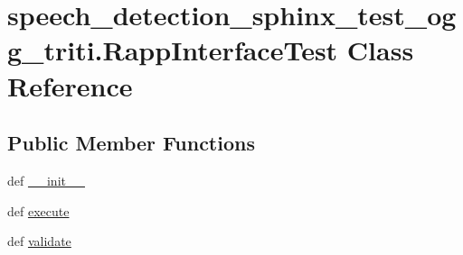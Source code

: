 \hypertarget{classspeech__detection__sphinx__test__ogg__triti_1_1RappInterfaceTest}{\section{speech\-\_\-detection\-\_\-sphinx\-\_\-test\-\_\-ogg\-\_\-triti.\-Rapp\-Interface\-Test Class Reference}
\label{classspeech__detection__sphinx__test__ogg__triti_1_1RappInterfaceTest}
}
\subsection*{Public Member Functions}
\begin{DoxyCompactItemize}
\item 
def \hyperlink{classspeech__detection__sphinx__test__ogg__triti_1_1RappInterfaceTest_ad03b8529f2cb7b329177c4109f58612e}{\-\_\-\-\_\-init\-\_\-\-\_\-}
\item 
def \hyperlink{classspeech__detection__sphinx__test__ogg__triti_1_1RappInterfaceTest_a52971cda2e8bea95411394a4bb65c063}{execute}
\item 
def \hyperlink{classspeech__detection__sphinx__test__ogg__triti_1_1RappInterfaceTest_a0994e3c5e8895f3d123a9115945d89ee}{validate}
\end{DoxyCompactItemize}
